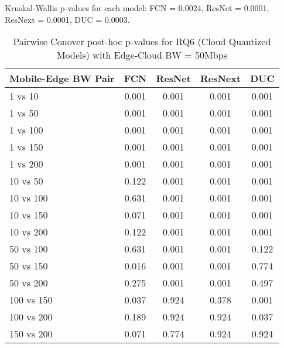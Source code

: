 \begin{table}[h]
\centering
\caption{Pairwise Conover post-hoc p-values for RQ6 (Cloud Quantized Models) with Edge-Cloud BW = 50Mbps}
\label{tab:conover_cloud_quantized_ec50}
\smallskip
Kruskal-Wallis p-values for each model: FCN = 0.0024, ResNet = 0.0001, ResNext = 0.0001, DUC = 0.0003.

\begin{tabular}{lcccc}
\toprule
Mobile-Edge BW Pair & FCN & ResNet & ResNext & DUC \\
\midrule
1 vs 10 & 0.001 & 0.001 & 0.001 & 0.001 \\
1 vs 50 & 0.001 & 0.001 & 0.001 & 0.001 \\
1 vs 100 & 0.001 & 0.001 & 0.001 & 0.001 \\
1 vs 150 & 0.001 & 0.001 & 0.001 & 0.001 \\
1 vs 200 & 0.001 & 0.001 & 0.001 & 0.001 \\
10 vs 50 & 0.122 & 0.001 & 0.001 & 0.001 \\
10 vs 100 & 0.631 & 0.001 & 0.001 & 0.001 \\
10 vs 150 & 0.071 & 0.001 & 0.001 & 0.001 \\
10 vs 200 & 0.122 & 0.001 & 0.001 & 0.001 \\
50 vs 100 & 0.631 & 0.001 & 0.001 & 0.122 \\
50 vs 150 & 0.016 & 0.001 & 0.001 & 0.774 \\
50 vs 200 & 0.275 & 0.001 & 0.001 & 0.497 \\
100 vs 150 & 0.037 & 0.924 & 0.378 & 0.001 \\
100 vs 200 & 0.189 & 0.924 & 0.924 & 0.037 \\
150 vs 200 & 0.071 & 0.774 & 0.924 & 0.924 \\
\bottomrule
\end{tabular}
\end{table}

